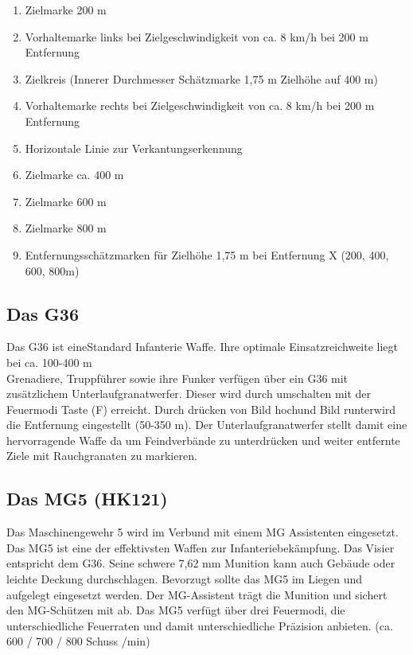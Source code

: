 \begin{enumerate}
\item Zielmarke 200 m
\item Vorhaltemarke links bei Zielgeschwindigkeit von ca. 8 km/h bei 200 m Entfernung
\item Zielkreis (Innerer Durchmesser Schätzmarke 1,75 m Zielhöhe auf 400 m)
\item Vorhaltemarke rechts bei Zielgeschwindigkeit von ca. 8 km/h bei 200 m Entfernung
\item Horizontale Linie zur Verkantungserkennung
\item Zielmarke ca. 400 m
\item Zielmarke 600 m
\item Zielmarke 800 m
\item Entfernungsschätzmarken für Zielhöhe 1,75 m bei Entfernung X (200, 400, 600, 800m)
\end{enumerate}

\subsection{Das G36}
Das G36 ist eineStandard Infanterie Waffe. Ihre optimale Einsatzreichweite liegt bei ca. 100-400 m \\
Grenadiere, Truppführer sowie ihre Funker verfügen über ein G36 mit zusätzlichem Unterlaufgranatwerfer. Dieser wird durch umschalten mit der Feuermodi Taste (F) erreicht. Durch drücken von \glqq Bild hoch\grqq und \glqq Bild runter\grqq wird die Entfernung eingestellt (50-350 m). Der Unterlaufgranatwerfer stellt damit eine hervorragende Waffe da um Feindverbände zu unterdrücken und weiter entfernte Ziele mit Rauchgranaten zu markieren. \\

\subsection{Das MG5 (HK121)}
Das Maschinengewehr 5 wird im Verbund mit einem MG Assistenten eingesetzt. Das MG5 ist eine der effektivsten Waffen zur Infanteriebekämpfung. Das Visier entspricht dem G36. Seine schwere 7,62 mm Munition kann auch Gebäude oder leichte Deckung durchschlagen. Bevorzugt sollte das MG5 im Liegen und aufgelegt eingesetzt werden. Der MG-Assistent trägt die Munition und sichert den MG-Schützen mit ab. Das MG5 verfügt über drei Feuermodi, die unterschiedliche Feuerraten und damit unterschiedliche Präzision anbieten.  (ca. 600  / 700 / 800 Schuss /min) \\

